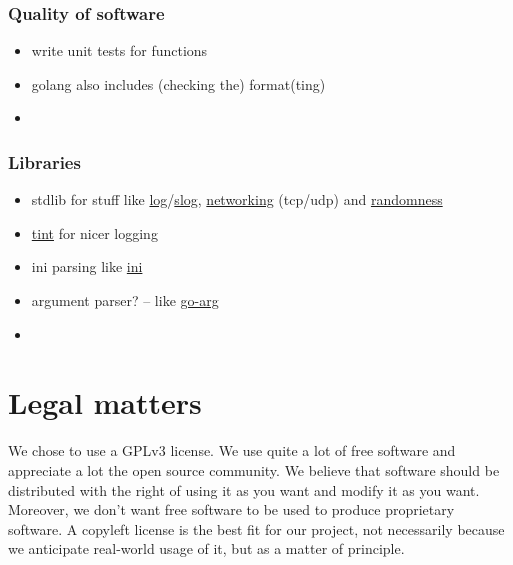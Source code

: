 \documentclass[a4paper,english,10pt,NET]{tumarticle}
\begin{document}
\subsubsection{Quality of software}


\begin{itemize}
	\item write unit tests for functions
	\item golang also includes (checking the) format(ting)
	\item {}
\end{itemize}

\subsubsection{Libraries}
\begin{itemize}
	\item stdlib for stuff like \href{https://pkg.go.dev/log}{log}/\href{https://pkg.go.dev/log/slog@go1.22.2}{slog}, \href{https://pkg.go.dev/net}{networking} (tcp/udp) and \href{https://pkg.go.dev/crypto/rand}{randomness}  %
	\item \href{github.com/lmittmann/tint}{tint} for nicer logging
	\item ini parsing like \href{gopkg.in/ini.v1}{ini}
	\item argument parser? -- like \href{https://github.com/alexflint/go-arg}{go-arg}
	\item {}
\end{itemize}

\section{Legal matters}


We chose to use a GPLv3 license.
We use quite a lot of free software and appreciate a lot the open source community. We believe that software should be distributed with the right of using it as you want and modify it as you want. Moreover, we don't want free software to be used to produce proprietary software. A copyleft license is the best fit for our project, not necessarily because we anticipate real-world usage of it, but as a matter of principle.
\end{document}
